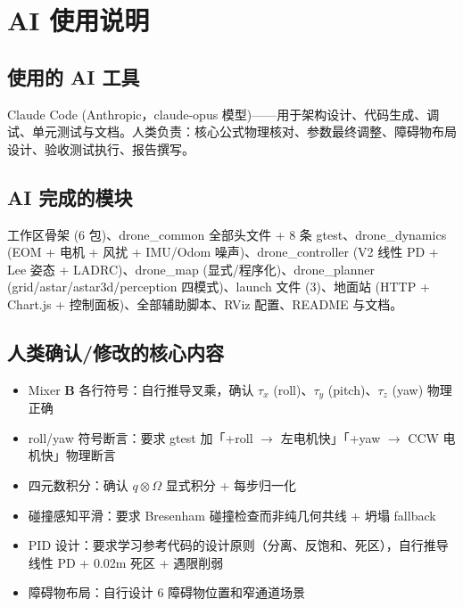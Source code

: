 \documentclass[12pt,a4paper]{article}
\begin{document}
\section{AI 使用说明}

\subsection{使用的 AI 工具}
Claude Code (Anthropic，claude-opus 模型)——用于架构设计、代码生成、调试、单元测试与文档。人类负责：核心公式物理核对、参数最终调整、障碍物布局设计、验收测试执行、报告撰写。

\subsection{AI 完成的模块}
工作区骨架 (6 包)、drone\_common 全部头文件 + 8 条 gtest、drone\_dynamics (EOM + 电机 + 风扰 + IMU/Odom 噪声)、drone\_controller (V2 线性 PD + Lee 姿态 + LADRC)、drone\_map (显式/程序化)、drone\_planner (grid/astar/astar3d/perception 四模式)、launch 文件 (3)、地面站 (HTTP + Chart.js + 控制面板)、全部辅助脚本、RViz 配置、README 与文档。

\subsection{人类确认/修改的核心内容}
\begin{itemize}[nosep]
  \item Mixer $\mathbf{B}$ 各行符号：自行推导叉乘，确认 $\tau_x$ (roll)、$\tau_y$ (pitch)、$\tau_z$ (yaw) 物理正确
  \item roll/yaw 符号断言：要求 gtest 加「+roll $\to$ 左电机快」「+yaw $\to$ CCW 电机快」物理断言
  \item 四元数积分：确认 $q\otimes\Omega$ 显式积分 + 每步归一化
  \item 碰撞感知平滑：要求 Bresenham 碰撞检查而非纯几何共线 + 坍塌 fallback
  \item PID 设计：要求学习参考代码的设计原则（分离、反饱和、死区），自行推导线性 PD + 0.02m 死区 + 遇限削弱
  \item 障碍物布局：自行设计 6 障碍物位置和窄通道场景
\end{itemize}
\end{document}
